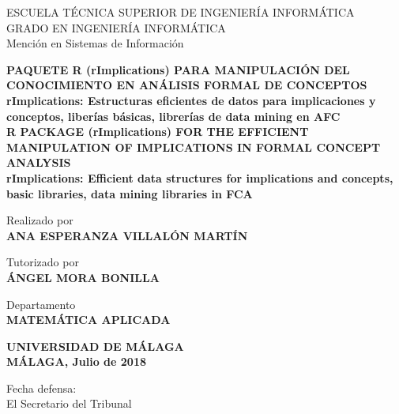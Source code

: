 \newpage
\thispagestyle{empty}
\mbox{}
\newpage
\thispagestyle{empty}
\mbox{}

\begin{titlepage}

    \begin{center}
		\normalsize {
            ESCUELA T\'ECNICA SUPERIOR DE INGENIER\'IA INFORM\'ATICA \\
            GRADO EN INGENIER\'IA INFORM\'ATICA \\
            Menci\'on en Sistemas de Informaci\'on \\}
	\end{center}

    \bigskip

    \begin{center}
		\normalsize {\textbf{
            PAQUETE R (rImplications) PARA MANIPULACI\'ON DEL CONOCIMIENTO 
            EN AN\'ALISIS FORMAL DE CONCEPTOS\\
            rImplications: Estructuras eficientes de datos para 
            implicaciones y conceptos, liber\'ias b\'asicas, 
            librer\'ias de data mining en AFC\\
            R PACKAGE (rImplications) FOR THE EFFICIENT MANIPULATION OF 
            IMPLICATIONS IN FORMAL CONCEPT ANALYSIS\\ 
            rImplications: Efficient data structures for implications 
            and concepts, basic libraries, data mining libraries in FCA
            }}
    \end{center}
    
    \smallskip

    \begin{center}
		\normalsize {
            Realizado por \\ \textbf{ANA ESPERANZA VILLAL\'ON MART\'IN}}
    \end{center}

    \begin{center}
		\normalsize {
            Tutorizado por \\ \textbf{\'ANGEL MORA BONILLA}}
    \end{center}

    \begin{center}
		\normalsize {
            Departamento \\ \textbf{MATEM\'ATICA APLICADA}}
    \end{center}

    \begin{center}
		\normalsize {
            \textbf{UNIVERSIDAD DE M\'ALAGA \\ M\'ALAGA, Julio de 2018}}
    \end{center}

    \bigskip

    \bigskip

    \begin{flushleft}
		\normalsize {
            Fecha defensa: \\ El Secretario del Tribunal}
    \end{flushleft}

\end{titlepage}

\newpage
\thispagestyle{empty}
\mbox{}

\newpage